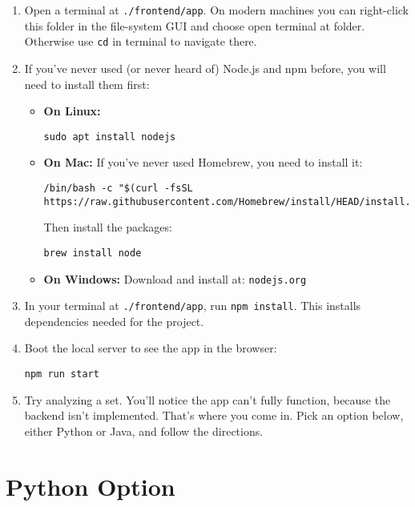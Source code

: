 \documentclass[11pt,letterpaper]{article}
\newcommand{\code}[1]{\texttt{\small #1}}
\begin{document}
\begin{enumerate}[leftmargin=*]
    \item Open a terminal at \code{./frontend/app}. On modern machines you can right-click this folder in the file-system GUI and choose open terminal at folder. Otherwise use \code{cd} in terminal to navigate there.
    
    \item If you've never used (or never heard of) Node.js and npm before, you will need to install them first:
    \begin{itemize}[leftmargin=*]
        \item \textbf{On Linux:}
        \begin{lstlisting}
sudo apt install nodejs
        \end{lstlisting}
        
        \item \textbf{On Mac:} If you've never used Homebrew, you need to install it:
        \begin{lstlisting}
/bin/bash -c "$(curl -fsSL https://raw.githubusercontent.com/Homebrew/install/HEAD/install.sh)"
        \end{lstlisting}
        Then install the packages:
        \begin{lstlisting}
brew install node
        \end{lstlisting}
        
        \item \textbf{On Windows:} Download and install at: \texttt{nodejs.org}
    \end{itemize}
    
    \item In your terminal at \code{./frontend/app}, run \code{npm install}. This installs dependencies needed for the project.
    
    \item Boot the local server to see the app in the browser:
    \begin{lstlisting}
npm run start
    \end{lstlisting}
    
    \item Try analyzing a set. You'll notice the app can't fully function, because the backend isn't implemented. That's where you come in. Pick an option below, either Python or Java, and follow the directions.
\end{enumerate}

\section{Python Option}
\end{document}
